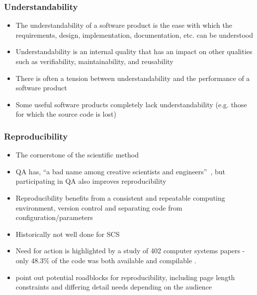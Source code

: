 \documentclass[t,12pt,numbers,fleqn]{beamer}
\begin{document}

\begin{frame}
\frametitle{Understandability}

\begin{itemize}
\item The understandability of a software product is the ease with which the
  requirements, design, implementation, documentation, etc. can be understood
\item Understandability is an internal quality that has an impact on other
  qualities such as verifiability, maintainability, and reusability
\item There is often a tension between understandability and the performance of
  a software product
\item Some useful software products completely lack understandability
  (e.g. those for which the source code is lost)
\end{itemize}

\end{frame}


\begin{frame}
\frametitle{Reproducibility}

\begin{itemize}
\item The cornerstone of the scientific method~\cite{Davison2012}
\item QA has, ``a bad name among creative scientists and
  engineers''~\cite[p.~352]{Roache1998}, but participating in QA also improves reproducibility
\item Reproducibility benefits from a consistent and repeatable
  computing environment, version control and separating code from
  configuration/parameters~\cite{Davison2012}
\item Historically not well done for SCS
\item Need for action is highlighted by a study of 402 computer systems papers -
  only 48.3\% of the code was both available and compilable
  \cite{CollbergEtAl2015}.
\item \cite{CrickAndHall2014} point out potential roadblocks for
  reproducibility, including page length constraints and differing detail needs
  depending on the audience
\end{itemize}

\end{frame}
\end{document}
